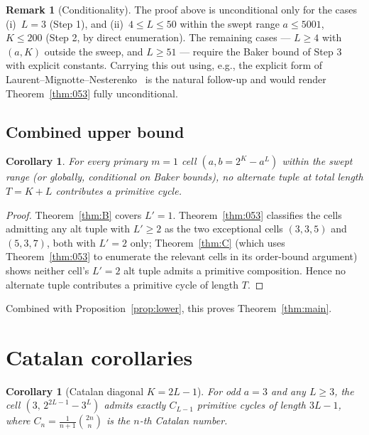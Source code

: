 \documentclass[11pt]{amsart}
\theoremstyle{plain}
\newtheorem{corollary}[theorem]{Corollary}
\theoremstyle{definition}
\newtheorem{remark}[theorem]{Remark}
\begin{document}
\begin{remark}[Conditionality] \label{rmk:cond}
The proof above is unconditional only for the cases
(i)~$L = 3$ (Step 1), and (ii)~$4 \leq L \leq 50$ within the swept
range $a \leq 5001$, $K \leq 200$ (Step 2, by direct enumeration).
The remaining cases — $L \geq 4$ with $(a, K)$ outside the sweep,
and $L \geq 51$ — require the Baker bound of Step 3 with explicit
constants. Carrying this out using, e.g., the explicit form of
Laurent--Mignotte--Nesterenko~\cite{lmn} is the natural follow-up
and would render Theorem~\ref{thm:053} fully unconditional.
\end{remark}

\subsection{Combined upper bound}

\begin{corollary}
For every primary $m = 1$ cell $(a, b = 2^K - a^L)$ within the swept
range (or globally, conditional on Baker bounds), no alternate tuple
at total length $T = K + L$ contributes a primitive cycle.
\end{corollary}

\begin{proof}
Theorem~\ref{thm:B} covers $L' = 1$. Theorem~\ref{thm:053} classifies
the cells admitting any alt tuple with $L' \geq 2$ as the two
exceptional cells $(3, 3, 5)$ and $(5, 3, 7)$, both with $L' = 2$
only; Theorem~\ref{thm:C} (which uses Theorem~\ref{thm:053} to enumerate
the relevant cells in its order-bound argument) shows neither cell's
$L' = 2$ alt tuple admits a primitive composition. Hence no alternate
tuple contributes a primitive cycle of length $T$.
\end{proof}

Combined with Proposition~\ref{prop:lower}, this proves
Theorem~\ref{thm:main}.

\section{Catalan corollaries} \label{sec:catalan}

\begin{corollary}[Catalan diagonal $K = 2L - 1$] \label{cor:cat-minus}
For odd $a = 3$ and any $L \geq 3$, the cell
$(3,\, 2^{2L-1} - 3^L)$ admits exactly $C_{L-1}$ primitive cycles of
length $3L - 1$, where $C_n = \frac{1}{n+1}\binom{2n}{n}$ is the
$n$-th Catalan number.
\end{corollary}
\end{document}
